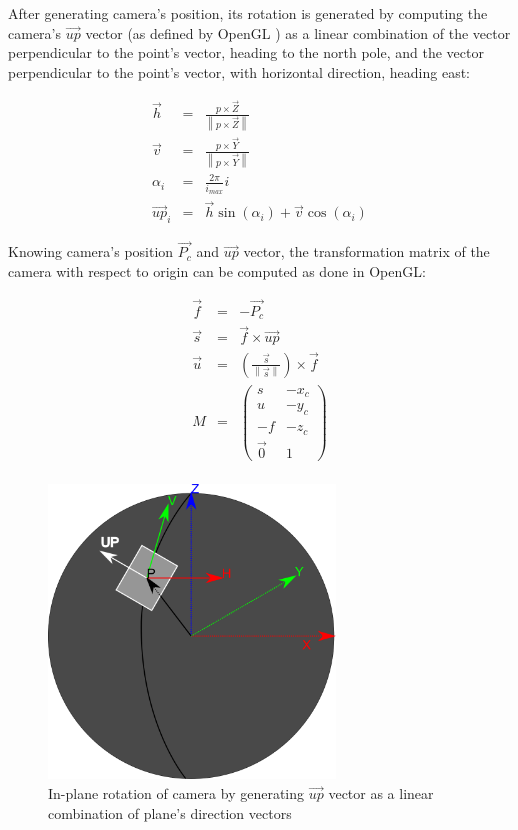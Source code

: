 After generating camera's position, its rotation is generated by computing the
camera's $\vec{up}$ vector (as defined by OpenGL \cite{opengl-book}) as a linear
combination of the vector perpendicular to the point's vector, heading to the
north pole, and the vector perpendicular to the point's vector, with horizontal
direction, heading east:

\begin{equation}
  \begin{array}{ccc}
  \vec{h} & = & \frac{ p  \times \vec{Z}}{\left\lVert p  \times \vec{Z}
  \right\rVert} \\
  \vec{v} & = & \frac{ p  \times \vec{Y}}{\left\lVert p  \times \vec{Y}
  \right\rVert} \\
  \alpha_i & = & \frac{2\pi}{i_{max}} i \\
  \vec{up}_i & = & \vec{h} \sin(\alpha_i) + \vec{v} \cos (\alpha_i)
  \end{array}
\end{equation}

Knowing camera's position $\vec{P_c}$ and $\vec{up}$ vector, the transformation matrix of
the camera with respect to origin can be computed as done in OpenGL:

\begin{equation}
  \begin{array}{ccc}
  \vec{f} & = & -\vec{P_c} \\
  \vec{s} & = & \vec{f} \times \vec{up} \\ 
  \vec{u} & = & \left( \frac{\vec{s} }{\left\lVert \vec{s}\right\rVert} 
  \right) \times \vec{f} \\
  M & = & \left(
  \begin{array}{cc}
    s & -x_c \\
    u & -y_c \\
    -f & -z_c  \\
    \vec{0} & 1
  \end{array} 
  \right) \\
  \end{array}
\end{equation}

\begin{figure}[htbp] \label{fig:up_vector}
\centering
\includegraphics[width=3in]{./Graphics/up_vector}
\caption{In-plane rotation of camera by generating $\vec{up}$ vector as a linear
combination of plane's direction vectors}
\end{figure}

